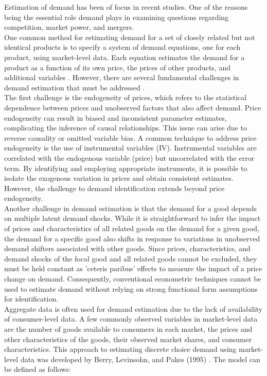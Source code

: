 \documentclass[a4paper,11pt]{article}
\begin{document}
    Estimation of demand has been of focus in recent studies. One of the reasons being the essential role demand plays in examining questions regarding competition, market power, and mergers.\\

    One common method for estimating demand for a set of closely related but not identical products is to specify a system of demand equations, one for each product, using market-level data. Each equation estimates the demand for a product as a function of its own price, the prices of other products, and additional variables \cite{Nevo}. However, there are several fundamental challenges in demand estimation that must be addressed \cite{BerryandHaile}.\\

    The first challenge is the endogeneity of prices, which refers to the statistical dependence between prices and unobserved factors that also affect demand. Price endogeneity can result in biased and inconsistent parameter estimates, complicating the inference of causal relationships. This issue can arise due to reverse causality or omitted variable bias. A common technique to address price endogeneity is the use of instrumental variables (IV). Instrumental variables are correlated with the endogenous variable (price) but uncorrelated with the error term. By identifying and employing appropriate instruments, it is possible to isolate the exogenous variation in prices and obtain consistent estimates. However, the challenge to demand identification extends beyond price endogeneity.\\

    Another challenge in demand estimation is that the demand for a good depends on multiple latent demand shocks. While it is straightforward to infer the impact of prices and characteristics of all related goods on the demand for a given good, the demand for a specific good also shifts in response to variations in unobserved demand shifters associated with other goods. Since prices, characteristics, and demand shocks of the focal good and all related goods cannot be excluded, they must be held constant as 'ceteris paribus' effects to measure the impact of a price change on demand. Consequently, conventional econometric techniques cannot be used to estimate demand without relying on strong functional form assumptions for identification.\\

    Aggregate data is often used for demand estimation due to the lack of availability of consumer-level data. A few commonly observed variables in market-level data are the number of goods available to consumers in each market, the prices and other characteristics of the goods, their observed market shares, and consumer characteristics. This approach to estimating discrete choice demand using market-level data was developed by Berry, Levinsohn, and Pakes (1995) \cite{blp1995}. The model can be defined as follows:
\end{document}
